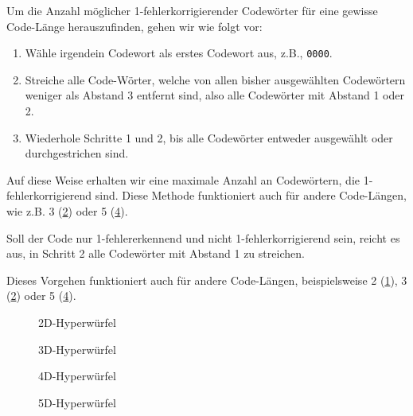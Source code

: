 \begin{mydefinition}
	Um die Anzahl möglicher 1-fehlerkorrigierender Codewörter für eine gewisse Code-Länge herauszufinden, gehen wir wie folgt vor:
	\begin{enumerate}
		\item Wähle irgendein Codewort als erstes Codewort aus, z.B., \texttt{0000}.
		\item Streiche alle Code-Wörter, welche von allen bisher ausgewählten Codewörtern weniger als Abstand 3 entfernt sind, also alle Codewörter mit Abstand 1 oder 2.
		\item Wiederhole Schritte 1 und 2, bis alle Codewörter entweder ausgewählt oder durchgestrichen sind.
	\end{enumerate}
	Auf diese Weise erhalten wir eine maximale Anzahl an Codewörtern, die 1-fehlerkorrigierend sind. Diese Methode funktioniert auch für andere Code-Längen, wie z.B. 3 (\cref{fig:3d}) oder 5 (\cref{fig:5d}).

	Soll der Code nur 1-fehlererkennend und nicht 1-fehlerkorrigierend sein, reicht es aus, in Schritt 2 alle Codewörter mit Abstand 1 zu streichen.

	Dieses Vorgehen funktioniert auch für andere Code-Längen, beispielsweise 2 (\cref{fig:2d}), 3 (\cref{fig:3d}) oder 5 (\cref{fig:5d}).
\end{mydefinition}

\begin{figure}[H]
	\centering
	\caption{2D-Hyperwürfel}
	\label{fig:2d}
\end{figure}

\begin{figure}[H]
	\centering
	\caption{3D-Hyperwürfel}
	\label{fig:3d}
\end{figure}

\begin{figure}[H]
	\centering
	\caption{4D-Hyperwürfel}
	\label{fig:4d}
\end{figure}

\begin{figure}[H]
	\centering
	\caption{5D-Hyperwürfel}
	\label{fig:5d}
\end{figure}


